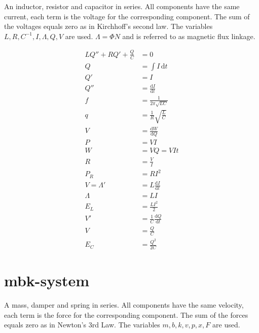\documentclass[]{../common/elementary-physics}
\begin{document}
An inductor, resistor and capacitor in series.
All components have the same current, each term is the voltage for the corresponding component.
The sum of the voltages equals zero as in Kirchhoff's second law.
The variables $L,R,C^{-1},I,\Lambda,Q,V$ are used.
$\Lambda = \Phi N$ and is referred to as magnetic flux linkage.

\begin{align}
L Q'' + R Q' + \frac{Q}{C} &= 0 \\
Q &= \int I \, \mathrm{d}t \\
Q' &= I \tag{definition of current} \\
Q'' &= \frac{\mathrm{d}I}{\mathrm{d}t} \\
f &= \frac{1}{2 \pi \sqrt{L C}} \tag{frequency} \\
q &= \frac{1}{R} \sqrt{\frac{L}{C}} \tag{quality factor}\\
V &= \frac{\mathrm{d}W}{\mathrm{d}Q} \\
P &= V I \tag{power} \\
W &= V Q = V I t \tag{work} \\
R &= \frac{V}{I} \tag{Ohm's law} \\
P_R &= R I^2 \tag{losses} \\
V = \Lambda' &= L \frac{\mathrm{d}I}{\mathrm{d}t} \tag{Faraday's law} \\
\Lambda &= L I \tag{definition of inductance} \\
E_L &= \frac{L I^2}{2} \tag{energy in a coil} \\
V' &= \frac{1}{C} \frac{\mathrm{d}Q}{\mathrm{d}t} \\
V &= \frac{Q}{C} \\
E_C &= \frac{Q^2}{2 C} \tag{energy} 
\end{align}

\pagebreak

\section{mbk-system}

A mass, damper and spring in series.
All components have the same velocity, each term is the force for the corresponding component.
The sum of the forces equals zero as in Newton's 3rd Law.
The variables $m,b,k,v,p,x,F$ are used.
\end{document}
